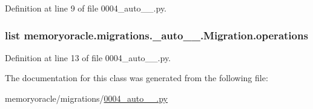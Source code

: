 Definition at line 9 of file 0004\+\_\+auto\+\_\+\_.\+py.

\hypertarget{classmemoryoracle_1_1migrations_1_10004__auto__20150402__2000_1_1Migration_a8e41e0b6119fa7ec86a386841472a802}{}
\subsubsection[{operations}]{\setlength{\rightskip}{0pt plus 5cm}list memoryoracle.\+migrations.\+\_\+auto\+\_\+\_.\+Migration.\+operations\hspace{0.3cm}{\ttfamily [static]}}\label{classmemoryoracle_1_1migrations_1_10004__auto__20150402__2000_1_1Migration_a8e41e0b6119fa7ec86a386841472a802}


Definition at line 13 of file 0004\+\_\+auto\+\_\+\_.\+py.



The documentation for this class was generated from the following file\+:\begin{DoxyCompactItemize}
\item 
memoryoracle/migrations/\hyperlink{0004__auto__20150402__2000_8py}{0004\+\_\+auto\+\_\+\_.\+py}\end{DoxyCompactItemize}
